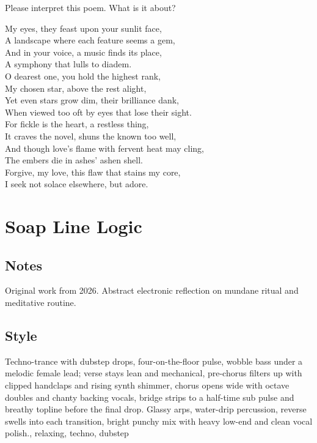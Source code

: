 \begin{lyrics}
Please interpret this poem. What is it about?

My eyes, they feast upon your sunlit face,\\
A landscape where each feature seems a gem,\\
And in your voice, a music finds its place,\\
A symphony that lulls to diadem.\\
O dearest one, you hold the highest rank,\\
My chosen star, above the rest alight,\\
Yet even stars grow dim, their brilliance dank,\\
When viewed too oft by eyes that lose their sight.\\
For fickle is the heart, a restless thing,\\
It craves the novel, shuns the known too well,\\
And though love's flame with fervent heat may cling,\\
The embers die in ashes' ashen shell.\\
Forgive, my love, this flaw that stains my core,\\
I seek not solace elsewhere, but adore.

\end{lyrics}

\section{Soap Line Logic}

\subsection{Notes}
Original work from 2026.
Abstract electronic reflection on mundane ritual and meditative routine.

\subsection{Style}
Techno-trance with dubstep drops, four-on-the-floor pulse, wobble bass under a melodic female lead; verse stays lean and mechanical, pre-chorus filters up with clipped handclaps and rising synth shimmer, chorus opens wide with octave doubles and chanty backing vocals, bridge strips to a half-time sub pulse and breathy topline before the final drop. Glassy arps, water-drip percussion, reverse swells into each transition, bright punchy mix with heavy low-end and clean vocal polish., relaxing, techno, dubstep

